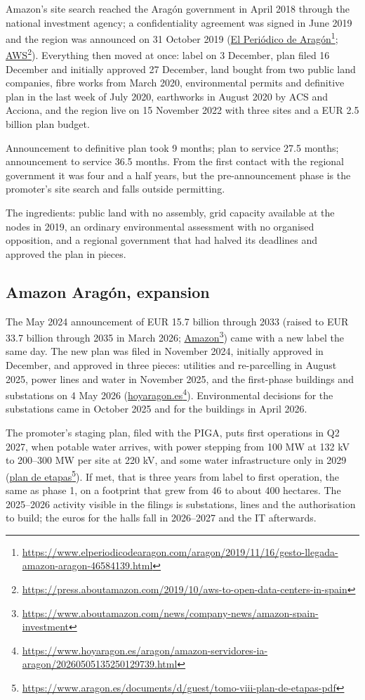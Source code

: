 \documentclass[11pt]{article}
\newcommand{\src}[2]{\href{#1}{#2}\footnote{\url{#1}}}
\begin{document}
Amazon's site search reached the Aragón government in April 2018 through the national investment agency; a confidentiality agreement was signed in June 2019 and the region was announced on 31 October 2019 (\src{https://www.elperiodicodearagon.com/aragon/2019/11/16/gesto-llegada-amazon-aragon-46584139.html}{El Periódico de Aragón}; \src{https://press.aboutamazon.com/2019/10/aws-to-open-data-centers-in-spain}{AWS}). Everything then moved at once: label on 3 December, plan filed 16 December and initially approved 27 December, land bought from two public land companies, fibre works from March 2020, environmental permits and definitive plan in the last week of July 2020, earthworks in August 2020 by ACS and Acciona, and the region live on 15 November 2022 with three sites and a EUR 2.5 billion plan budget.

Announcement to definitive plan took 9 months; plan to service 27.5 months; announcement to service 36.5 months. From the first contact with the regional government it was four and a half years, but the pre-announcement phase is the promoter's site search and falls outside permitting.

The ingredients: public land with no assembly, grid capacity available at the nodes in 2019, an ordinary environmental assessment with no organised opposition, and a regional government that had halved its deadlines and approved the plan in pieces.

\subsection{Amazon Aragón, expansion}

The May 2024 announcement of EUR 15.7 billion through 2033 (raised to EUR 33.7 billion through 2035 in March 2026; \src{https://www.aboutamazon.com/news/company-news/amazon-spain-investment}{Amazon}) came with a new label the same day. The new plan was filed in November 2024, initially approved in December, and approved in three pieces: utilities and re-parcelling in August 2025, power lines and water in November 2025, and the first-phase buildings and substations on 4 May 2026 (\src{https://www.hoyaragon.es/aragon/amazon-servidores-ia-aragon/20260505135250129739.html}{hoyaragon.es}). Environmental decisions for the substations came in October 2025 and for the buildings in April 2026.

The promoter's staging plan, filed with the PIGA, puts first operations in Q2 2027, when potable water arrives, with power stepping from 100 MW at 132 kV to 200--300 MW per site at 220 kV, and some water infrastructure only in 2029 (\src{https://www.aragon.es/documents/d/guest/tomo-viii-plan-de-etapas-pdf}{plan de etapas}). If met, that is three years from label to first operation, the same as phase 1, on a footprint that grew from 46 to about 400 hectares. The 2025--2026 activity visible in the filings is substations, lines and the authorisation to build; the euros for the halls fall in 2026--2027 and the IT afterwards.
\end{document}
